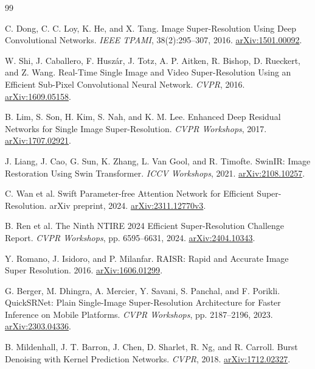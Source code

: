 \documentclass[10pt,twocolumn,letterpaper]{article}
\begin{document}
\begin{thebibliography}{99}
\fontsize{8}{9}\selectfont\raggedright
\setlength{\itemsep}{0.5pt}
C. Dong, C. C. Loy, K. He, and X. Tang.
Image Super-Resolution Using Deep Convolutional Networks.
\emph{IEEE TPAMI}, 38(2):295--307, 2016.
\href{https://arxiv.org/abs/1501.00092}{arXiv:1501.00092}.

W. Shi, J. Caballero, F. Husz\'ar, J. Totz, A. P. Aitken, R. Bishop, D. Rueckert, and Z. Wang.
Real-Time Single Image and Video Super-Resolution Using an Efficient Sub-Pixel Convolutional Neural Network.
\emph{CVPR}, 2016.
\href{https://arxiv.org/abs/1609.05158}{arXiv:1609.05158}.

B. Lim, S. Son, H. Kim, S. Nah, and K. M. Lee.
Enhanced Deep Residual Networks for Single Image Super-Resolution.
\emph{CVPR Workshops}, 2017.
\href{https://arxiv.org/abs/1707.02921}{arXiv:1707.02921}.

J. Liang, J. Cao, G. Sun, K. Zhang, L. Van Gool, and R. Timofte.
SwinIR: Image Restoration Using Swin Transformer.
\emph{ICCV Workshops}, 2021.
\href{https://arxiv.org/abs/2108.10257}{arXiv:2108.10257}.

C. Wan et al.
Swift Parameter-free Attention Network for Efficient Super-Resolution.
arXiv preprint, 2024.
\href{https://arxiv.org/abs/2311.12770v3}{arXiv:2311.12770v3}.

B. Ren et al.
The Ninth NTIRE 2024 Efficient Super-Resolution Challenge Report.
\emph{CVPR Workshops}, pp. 6595--6631, 2024.
\href{https://arxiv.org/abs/2404.10343}{arXiv:2404.10343}.

Y. Romano, J. Isidoro, and P. Milanfar.
RAISR: Rapid and Accurate Image Super Resolution.
2016.
\href{https://arxiv.org/abs/1606.01299}{arXiv:1606.01299}.

G. Berger, M. Dhingra, A. Mercier, Y. Savani, S. Panchal, and F. Porikli.
QuickSRNet: Plain Single-Image Super-Resolution Architecture for Faster Inference on Mobile Platforms.
\emph{CVPR Workshops}, pp. 2187--2196, 2023.
\href{https://arxiv.org/abs/2303.04336}{arXiv:2303.04336}.

B. Mildenhall, J. T. Barron, J. Chen, D. Sharlet, R. Ng, and R. Carroll.
Burst Denoising with Kernel Prediction Networks.
\emph{CVPR}, 2018.
\href{https://arxiv.org/abs/1712.02327}{arXiv:1712.02327}.


\end{thebibliography}
\end{document}

